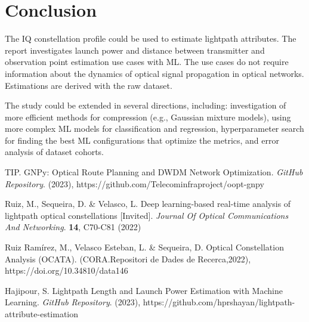 \documentclass[lettersize,journal, one-column]{IEEEtran}
\begin{document}
\section{Conclusion}
\label{section:conclusion}
The IQ constellation profile could be used to estimate lightpath attributes.
The report investigates launch power and distance between transmitter and observation point estimation use cases with ML.
The use cases do not require information about the dynamics of optical signal propagation in optical networks.
Estimations are derived with the raw dataset. 

The study could be extended in several directions, including: investigation of more efficient methods for compression (e.g., Gaussian mixture models), using more complex ML models for classification and regression, hyperparameter search for finding the best ML configurations that optimize the metrics, and error analysis of dataset cohorts.


\begin{thebibliography}{1}


TIP. GNPy: Optical Route Planning and DWDM Network Optimization. {\em GitHub Repository}. (2023), https://github.com/Telecominfraproject/oopt-gnpy

Ruiz, M., Sequeira, D. \& Velasco, L. Deep learning-based real-time analysis of lightpath optical constellations [Invited]. {\em Journal Of Optical Communications And Networking}. \textbf{14}, C70-C81 (2022)

Ruiz Ramírez, M., Velasco Esteban, L. \& Sequeira, D. Optical Constellation Analysis (OCATA). (CORA.Repositori de Dades de Recerca,2022), https://doi.org/10.34810/data146

Hajipour, S. Lightpath Length and Launch Power Estimation with Machine Learning. {\em GitHub Repository}. (2023), https://github.com/hprshayan/lightpath-attribute-estimation




\end{thebibliography}
\end{document}

